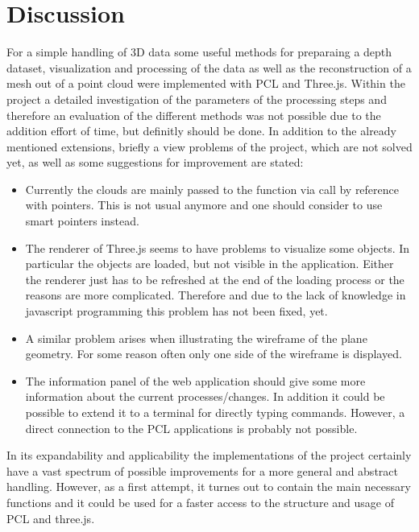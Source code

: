 \documentclass[paper=a4,11pt,bibliography=totoc]{scrartcl}
\begin{document}
\section{Discussion}
%
For a simple handling of 3D data some useful methods for preparaing a depth dataset, visualization and processing of the data as well as the reconstruction of a mesh out of a point cloud were implemented with PCL and Three.js. Within the project a detailed investigation of the parameters of the processing steps and therefore an evaluation of the different methods was not possible due to the addition effort of time, but definitly should be done. In addition to the already mentioned extensions, briefly a view problems of the project, which are not solved yet, as well as some suggestions for improvement are stated:
%
\begin{itemize}
 \item Currently the clouds are mainly passed to the function via call by reference with pointers. This is not usual anymore and one should consider to use smart pointers instead.
 \item The renderer of Three.js seems to have problems to visualize some objects. In particular the objects are loaded, but not visible in the application. Either the renderer just has to be refreshed at the end of the loading process or the reasons are more complicated. Therefore and due to the lack of knowledge in javascript programming this problem has not been fixed, yet.
 \item A similar problem arises when illustrating the wireframe of the plane geometry. For some reason often only one side of the wireframe is displayed.
 \item The information panel of the web application should give some more information about the current processes/changes. In addition it could be possible to extend it to a terminal for directly typing commands. However, a direct connection to the PCL applications is probably not possible.
\end{itemize}
%
In its expandability and applicability the implementations of the project certainly have a vast spectrum of possible improvements for a more general and abstract handling. However, as a first attempt, it turnes out to contain the main necessary functions and it could be used for a faster access to the structure and usage of PCL and three.js.
\newpage
\end{document}
